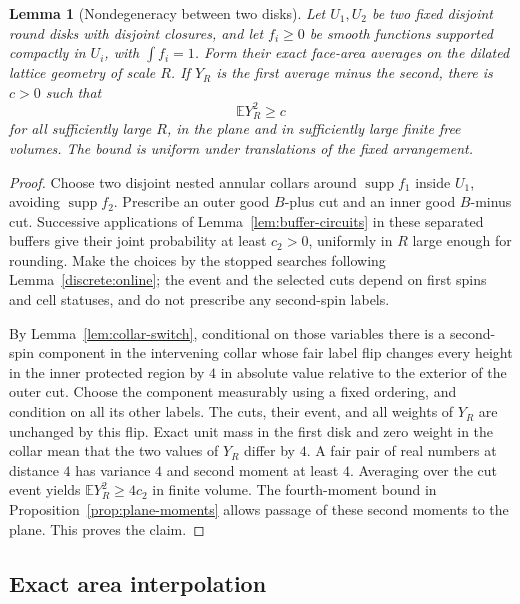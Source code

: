 \documentclass[11pt]{article}
\newcommand{\E}{\mathbb E}
\DeclareMathOperator{\supp}{supp}
\newtheorem{lemma}[theorem]{Lemma}
\theoremstyle{definition}
\theoremstyle{remark}
\numberwithin{equation}{section}
\begin{document}
\begin{lemma}[Nondegeneracy between two disks]\label{lem:nondegeneracy}
Let $U_1,U_2$ be two fixed disjoint round disks with disjoint closures,
and let $f_i\geq0$ be smooth functions supported compactly in $U_i$,
with $\int f_i=1$.  Form their exact face-area averages on the dilated
lattice geometry of scale $R$.  If $Y_R$ is the first average minus
the second, there is $c>0$ such that
\begin{equation}\label{moments:nondegeneracy}
 \E Y_R^2\geq c
\end{equation}
for all sufficiently large $R$, in the plane and in sufficiently large
finite free volumes.  The bound is uniform under translations of the
fixed arrangement.
\end{lemma}

\begin{proof}
Choose two disjoint nested annular collars around $\supp f_1$ inside
$U_1$, avoiding $\supp f_2$.  Prescribe an outer good $B$-plus cut and
an inner good $B$-minus cut.  Successive applications of
Lemma~\ref{lem:buffer-circuits} in these separated buffers give their
joint probability at least $c_2>0$, uniformly in $R$ large enough for
rounding.  Make the choices by the stopped searches following
Lemma~\ref{discrete:online}; the event and the selected cuts
depend on first spins and cell statuses, and do not prescribe any
second-spin labels.

By Lemma~\ref{lem:collar-switch}, conditional on those variables there
is a second-spin component in the intervening collar whose fair label
flip changes every height in the inner protected region by $4$ in
absolute value relative to the exterior of the outer cut.  Choose the
component measurably using a fixed ordering, and condition on all its
other labels.  The cuts, their event, and all weights of $Y_R$ are
unchanged by this flip.  Exact unit mass in the first disk and zero
weight in the collar mean that the two values of $Y_R$ differ by $4$.
A fair pair of real numbers at distance $4$ has variance $4$ and
second moment at least $4$.  Averaging over the cut event yields
$\E Y_R^2\geq4c_2$ in finite volume.  The fourth-moment bound in
Proposition~\ref{prop:plane-moments} allows passage of these second
moments to the plane.  This proves the claim.
\end{proof}

\subsection{Exact area interpolation}
\end{document}

